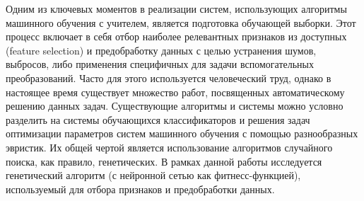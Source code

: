 \documentclass[utf8,usehyperref,14pt]{G7-32}
\begin{document}

\frontmatter %



\tableofcontents


\Introduction

Одним из ключевых моментов в реализации систем, использующих алгоритмы машинного обучения с учителем, является подготовка обучающей выборки. Этот процесс включает в себя отбор наиболее релевантных признаков из доступных (feature selection) и предобработку данных с целью устранения шумов, выбросов, либо применения специфичных для задачи вспомогательных преобразований. Часто для этого используется человеческий труд, однако в настоящее время существует множество работ, посвященных автоматическому решению данных задач. Существующие алгоритмы и системы можно условно разделить на системы обучающихся классификаторов и решения задач оптимизации параметров систем машинного обучения с помощью разнообразных эвристик. Их общей чертой является использование алгоритмов случайного поиска, как правило, генетических. В рамках данной работы исследуется генетический алгоритм (с нейронной сетью как фитнесс-функцией), используемый для отбора признаков и предобработки данных. \cite{HSWGCroatia,Clever_Algorithms,DataMining,GAinClassifier,AI}
\end{document}
